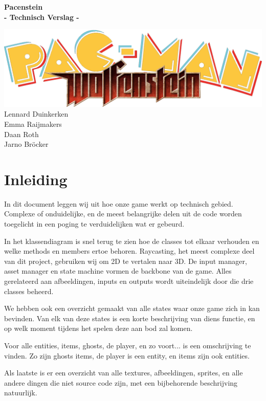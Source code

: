 \documentclass{report}
\begin{document}
\begin{titlepage}
\centering
\vfill
\bfseries\Huge{Pacenstein\\\large{- Technisch Verslag -}}\\
\normalfont\normalsize{}
\vfill

\includegraphics[width=\textwidth]{../res/pacenstein.png}
\vfill
\large{
  Lennard Duinkerken\\
  Emma Raijmakers\\
  Daan Roth\\
  Jarno Bröcker
}
\vfill
\end{titlepage}

\tableofcontents

\chapter{Inleiding} %
\label{cha:inleiding}
In dit document leggen wij uit hoe onze game werkt op technisch gebied. Complexe of onduidelijke, en de meest belangrijke delen uit de code worden toegelicht in een poging te verduidelijken wat er gebeurd.

In het klassendiagram is snel terug te zien hoe de classes tot elkaar verhouden en welke methods en members ertoe behoren. Raycasting, het meest complexe deel van dit project, gebruiken wij om 2D te vertalen naar 3D. De input manager, asset manager en state machine vormen de backbone van de game. Alles gerelateerd aan afbeeldingen, inputs en outputs wordt uiteindelijk door die drie classes beheerd.

We hebben ook een overzicht gemaakt van alle states waar onze game zich in kan bevinden. Van elk van deze states is een korte beschrijving van diens functie, en op welk moment tijdens het spelen deze aan bod zal komen.

Voor alle entities, items, ghosts, de player, en zo voort... is een omschrijving te vinden. Zo zijn ghosts items, de player is een entity, en items zijn ook entities.

Als laatste is er een overzicht van alle textures, afbeeldingen, sprites, en alle andere dingen die niet source code zijn, met een bijbehorende beschrijving natuurlijk.
\end{document}
